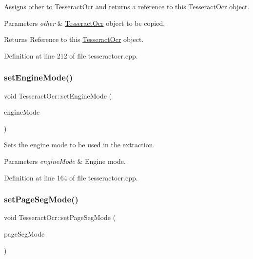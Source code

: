 Assigns other to \mbox{\hyperlink{classTesseractOcr}{Tesseract\+Ocr}} and returns a reference to this \mbox{\hyperlink{classTesseractOcr}{Tesseract\+Ocr}} object. 


\begin{DoxyParams}{Parameters}
{\em other} & \mbox{\hyperlink{classTesseractOcr}{Tesseract\+Ocr}} object to be copied. \\
\hline
\end{DoxyParams}
\begin{DoxyReturn}{Returns}
Reference to this \mbox{\hyperlink{classTesseractOcr}{Tesseract\+Ocr}} object. 
\end{DoxyReturn}


Definition at line 212 of file tesseractocr.\+cpp.

\mbox{\label{classTesseractOcr_acd714224045f4808b732f865164e1e1a}} 
\subsubsection{\texorpdfstring{set\+Engine\+Mode()}{setEngineMode()}}
{\footnotesize\ttfamily void Tesseract\+Ocr\+::set\+Engine\+Mode (\begin{DoxyParamCaption}\item[{tesseract\+::\+Ocr\+Engine\+Mode}]{engine\+Mode }\end{DoxyParamCaption})}



Sets the engine mode to be used in the extraction. 


\begin{DoxyParams}{Parameters}
{\em engine\+Mode} & Engine mode. \\
\hline
\end{DoxyParams}


Definition at line 164 of file tesseractocr.\+cpp.

\mbox{\label{classTesseractOcr_a16b1a94b0829a668e2f3ebc48c6e9e37}} 
\subsubsection{\texorpdfstring{set\+Page\+Seg\+Mode()}{setPageSegMode()}}
{\footnotesize\ttfamily void Tesseract\+Ocr\+::set\+Page\+Seg\+Mode (\begin{DoxyParamCaption}\item[{tesseract\+::\+Page\+Seg\+Mode}]{page\+Seg\+Mode }\end{DoxyParamCaption})}



